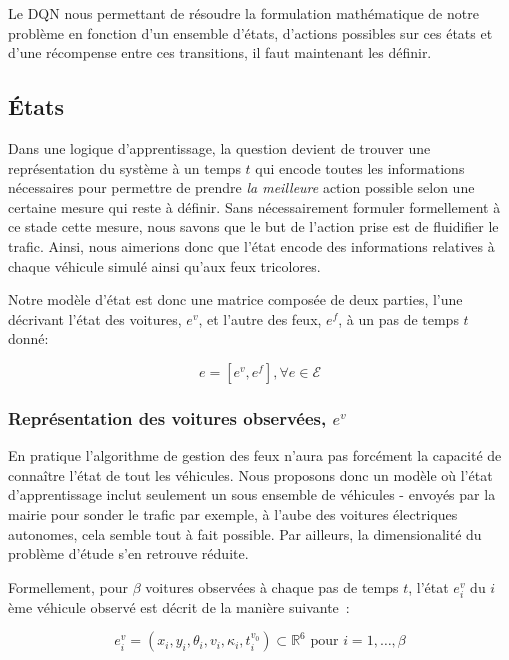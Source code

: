 \documentclass[11pt]{article}
\begin{document}
Le DQN nous permettant de résoudre la formulation mathématique de notre problème en fonction d'un ensemble d'états, d'actions possibles sur ces états et d'une récompense entre ces transitions, il faut maintenant les définir.

\subsection{États}
\label{sec:orgf9273d9}

Dans une logique d'apprentissage, la question devient de trouver une représentation du système à un temps \(t\) qui encode toutes les informations nécessaires pour permettre de prendre \emph{la meilleure} action possible selon une certaine mesure qui reste à définir. Sans nécessairement formuler formellement à ce stade cette mesure, nous savons que le but de l'action prise est de fluidifier le trafic. Ainsi, nous aimerions donc que l'état encode des informations relatives à chaque véhicule simulé ainsi qu'aux feux tricolores.

Notre modèle d'état est donc une matrice composée de deux parties, l'une décrivant l'état des voitures, \(e^v\), et l'autre des feux, \(e^f\), à un pas de temps \(t\) donné:


\begin{latex}
\begin{equation}
    e = [e^v, e^f], \forall e \in \mathcal{E}
\end{equation}
\end{latex}

\subsubsection{Représentation des voitures observées, \(e^v\)}
\label{sec:org4ea00da}

En pratique l'algorithme de gestion des feux n'aura pas forcément la capacité de connaître l'état de tout les véhicules. Nous proposons donc un modèle où l'état d'apprentissage inclut seulement un sous ensemble de véhicules - envoyés par la mairie pour sonder le trafic par exemple, à l'aube des voitures électriques autonomes, cela semble tout à fait possible. Par ailleurs, la dimensionalité du problème d'étude s'en retrouve réduite.

Formellement, pour \(\beta\) voitures observées à chaque pas de temps \(t\), l'état \(e^v_i\) du \(i\) ème véhicule observé est décrit de la manière suivante :

\begin{latex}
\begin{equation}
    e^v_i = (x_i, y_i, \theta_i, v_i, \kappa_i, t^{v_0}_i) \subset \mathbb{R}^6 \mbox{ pour } i = 1, …, \beta
\end{equation}
\end{latex}
\end{document}
